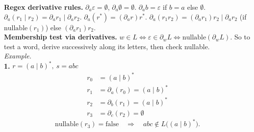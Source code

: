\documentclass[9pt, a4paper]{extarticle}
\begin{document}
\begin{minipage}[t]{0.495\textwidth}
\textbf{Regex derivative rules.} $\partial_a\varepsilon=\emptyset$, $\partial_a\emptyset=\emptyset$. $\partial_a b=\varepsilon$ if $b=a$ else $\emptyset$. $\partial_a(r_1 \mid r_2)=\partial_a r_1 \mid \partial_a r_2$. $\partial_a(r^*)=(\partial_a r)r^*$. $\partial_a(r_1r_2)= (\partial_a r_1)r_2 \mid \partial_a r_2$ (if $\text{nullable}(r_1)$) else $(\partial_a r_1)r_2$.\\
\textbf{Membership test via derivatives.} $w \in L \iff \varepsilon \in \partial_w L \iff \text{nullable}(\partial_w L)$. So to test a word, derive successively along its letters, then check nullable.\\
\textit{Example.}\\
\textbf{1.} \(r=(a\mid b)^*,\ s=abc\)
\[
\begin{aligned}
r_0&=(a\mid b)^*\\
r_1&=\partial_a(r_0)=(a\mid b)^*\\
r_2&=\partial_b(r_1)=(a\mid b)^*\\
r_3&=\partial_c(r_2)=\emptyset
\end{aligned}
\]
\[
\text{nullable}(r_3)=\text{false}
\quad\Longrightarrow\quad
abc\notin L\big((a\mid b)^*\big).
\]
\end{minipage}
\hfill
\noindent
\end{document}
